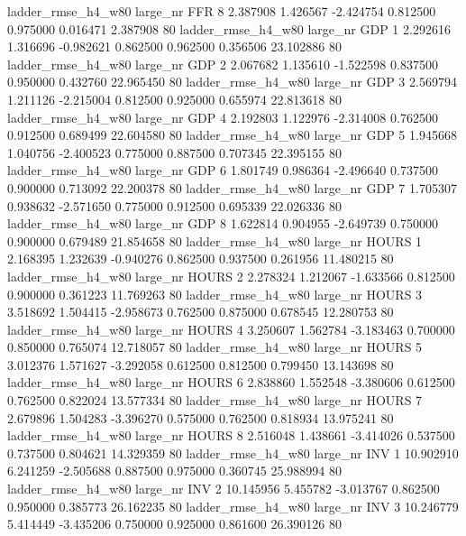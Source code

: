  ladder_rmse_h4_w80   large_nr      FFR                 8  2.387908  1.426567  -2.424754 0.812500 0.975000  0.016471    2.387908 80
 ladder_rmse_h4_w80   large_nr      GDP                 1  2.292616  1.316696  -0.982621 0.862500 0.962500  0.356506   23.102886 80
 ladder_rmse_h4_w80   large_nr      GDP                 2  2.067682  1.135610  -1.522598 0.837500 0.950000  0.432760   22.965450 80
 ladder_rmse_h4_w80   large_nr      GDP                 3  2.569794  1.211126  -2.215004 0.812500 0.925000  0.655974   22.813618 80
 ladder_rmse_h4_w80   large_nr      GDP                 4  2.192803  1.122976  -2.314008 0.762500 0.912500  0.689499   22.604580 80
 ladder_rmse_h4_w80   large_nr      GDP                 5  1.945668  1.040756  -2.400523 0.775000 0.887500  0.707345   22.395155 80
 ladder_rmse_h4_w80   large_nr      GDP                 6  1.801749  0.986364  -2.496640 0.737500 0.900000  0.713092   22.200378 80
 ladder_rmse_h4_w80   large_nr      GDP                 7  1.705307  0.938632  -2.571650 0.775000 0.912500  0.695339   22.026336 80
 ladder_rmse_h4_w80   large_nr      GDP                 8  1.622814  0.904955  -2.649739 0.750000 0.900000  0.679489   21.854658 80
 ladder_rmse_h4_w80   large_nr    HOURS                 1  2.168395  1.232639  -0.940276 0.862500 0.937500  0.261956   11.480215 80
 ladder_rmse_h4_w80   large_nr    HOURS                 2  2.278324  1.212067  -1.633566 0.812500 0.900000  0.361223   11.769263 80
 ladder_rmse_h4_w80   large_nr    HOURS                 3  3.518692  1.504415  -2.958673 0.762500 0.875000  0.678545   12.280753 80
 ladder_rmse_h4_w80   large_nr    HOURS                 4  3.250607  1.562784  -3.183463 0.700000 0.850000  0.765074   12.718057 80
 ladder_rmse_h4_w80   large_nr    HOURS                 5  3.012376  1.571627  -3.292058 0.612500 0.812500  0.799450   13.143698 80
 ladder_rmse_h4_w80   large_nr    HOURS                 6  2.838860  1.552548  -3.380606 0.612500 0.762500  0.822024   13.577334 80
 ladder_rmse_h4_w80   large_nr    HOURS                 7  2.679896  1.504283  -3.396270 0.575000 0.762500  0.818934   13.975241 80
 ladder_rmse_h4_w80   large_nr    HOURS                 8  2.516048  1.438661  -3.414026 0.537500 0.737500  0.804621   14.329359 80
 ladder_rmse_h4_w80   large_nr      INV                 1 10.902910  6.241259  -2.505688 0.887500 0.975000  0.360745   25.988994 80
 ladder_rmse_h4_w80   large_nr      INV                 2 10.145956  5.455782  -3.013767 0.862500 0.950000  0.385773   26.162235 80
 ladder_rmse_h4_w80   large_nr      INV                 3 10.246779  5.414449  -3.435206 0.750000 0.925000  0.861600   26.390126 80
